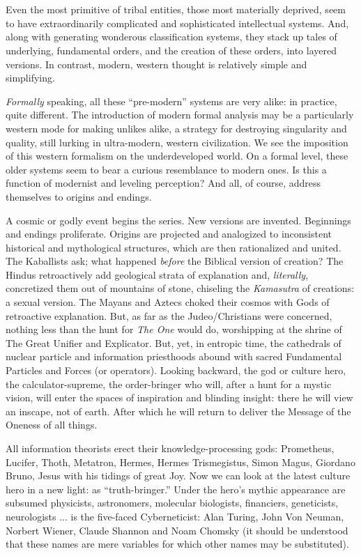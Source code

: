 \chapter{}

Even the most primitive of tribal entities, those most materially deprived, seem to have extraordinarily complicated and sophisticated intellectual systems. And, along with generating wonderous classification systems, they stack up tales of underlying, fundamental orders, and the creation of these orders, into layered versions. In contrast, modern, western thought is relatively simple and simplifying. 

\emph{Formally} speaking, all these \enquote{pre-modern} systems are very alike: in practice, quite different. The introduction of modern formal analysis may be a particularly western mode for making unlikes alike, a strategy for destroying singularity and quality, still lurking in ultra-modern, western civilization. We see the imposition of this western formalism on the underdeveloped world. On a formal level, these older systems seem to bear a curious resemblance to modern ones. Is this a function of modernist and leveling perception? And all, of course, address themselves to origins and endings.

A cosmic or godly event begins the series. New versions are invented. Beginnings and endings proliferate. Origins are projected and analogized to inconsistent historical and mythological structures, which are then rationalized and united. The Kaballists ask; what happened \emph{before} the Biblical version of creation? The Hindus retroactively add geological strata of explanation and, \emph{literally}, concretized them out of mountains of stone, chiseling the \emph{Kamasutra} of creations: a sexual version. The Mayans and Aztecs choked their cosmos with Gods of retroactive explanation. But, as far as the Judeo\slash Christians were concerned, nothing less than the hunt for \emph{The One} would do, worshipping at the shrine of The Great Unifier and Explicator. But, yet, in entropic time, the cathedrals of nuclear particle and information priesthoods abound with sacred Fundamental Particles and Forces (or operators). Looking backward, the god or culture hero, the calculator-supreme, the order-bringer who will, after a hunt for a mystic vision, will enter the spaces of inspiration and blinding insight: there he will view an inscape, not of earth. After which he will return to deliver the Message of the Oneness of all things.

All information theorists erect their knowledge-processing gods: Prometheus, Lucifer, Thoth, Metatron, Hermes, Hermes Trismegistus, Simon Magus, Giordano Bruno, Jesus with his tidings of great Joy. Now we can look at the latest culture hero in a new light: as \enquote{truth-bringer.} Under the hero's mythic appearance are subsumed physicists, astronomers, molecular biologists, financiers, geneticists, neurologists ... is the five-faced Cyberneticist: Alan Turing, John Von Neuman, Norbert Wiener, Claude Shannon and Noam Chomsky (it should be understood that these names are mere variables for which other names may be substituted).

